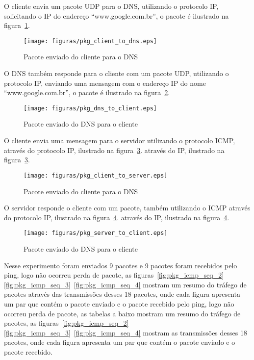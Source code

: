 O cliente envia um pacote UDP para o DNS, utilizando o protocolo
IP, solicitando o IP do endereço “www.google.com.br”, o pacote é ilustrado
na figura~\ref{fig:pkg_client_to_dns}.

    \begin{figure}[h]
      \centering
      \texttt{[image: figuras/pkg\_client\_to\_dns.eps]}
      \caption{Pacote enviado do cliente para o DNS}
      \label{fig:pkg_client_to_dns}
    \end{figure}

O DNS também responde para o cliente com um pacote UDP, utilizando
o protocolo IP, enviando uma mensagem com o endereço IP do nome
“www.google.com.br”, o pacote é ilustrado na figura~\ref{fig:pkg_dns_to_client}.

    \begin{figure}[h]
      \centering
      \texttt{[image: figuras/pkg\_dns\_to\_client.eps]}
      \caption{Pacote enviado do DNS para o cliente}
      \label{fig:pkg_dns_to_client}
    \end{figure}

O cliente envia uma mensagem para o servidor utilizando o protocolo ICMP,
através do protocolo IP, ilustrado na figura~\ref{fig:pkg_client_to_server}.
através do IP, ilustrado na figura~\ref{fig:pkg_client_to_server}.

    \begin{figure}[h]
      \centering
      \texttt{[image: figuras/pkg\_client\_to\_server.eps]}
      \caption{Pacote enviado do cliente para o DNS}
      \label{fig:pkg_client_to_server}
    \end{figure}

O servidor responde o cliente com um pacote, também utilizando o ICMP
através do protocolo IP, ilustrado na figura~\ref{fig:pkg_server_to_client}.
através do IP, ilustrado na figura~\ref{fig:pkg_server_to_client}.

    \begin{figure}[h]
      \centering
      \texttt{[image: figuras/pkg\_server\_to\_client.eps]}
      \caption{Pacote enviado do DNS para o cliente}
      \label{fig:pkg_server_to_client}
    \end{figure}

Nesse experimento foram enviados 9 pacotes e 9 pacotes foram recebidos
pelo ping, logo não ocorreu perda de pacote, as figuras~\ref{fig:pkg_icmp_seq_2}
\ref{fig:pkg_icmp_seq_3}~\ref{fig:pkg_icmp_seq_4} mostram um resumo do
tráfego de pacotes através das transmissões desses 18 pacotes, onde cada
figura apresenta um par que contém o pacote enviado e o pacote recebido
pelo ping, logo não ocorreu perda de pacote, as tabelas a baixo mostram
um resumo do tráfego de pacotes, as figuras~\ref{fig:pkg_icmp_seq_2}
\ref{fig:pkg_icmp_seq_3}~\ref{fig:pkg_icmp_seq_4} mostram as transmissões
desses 18 pacotes, onde cada figura apresenta um par que contém o pacote
enviado e o pacote recebido.


